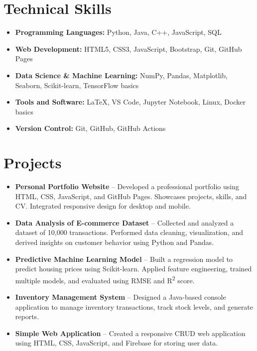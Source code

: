 \documentclass[a4paper,10pt]{article}
\begin{document}
\section*{Technical Skills}
\begin{itemize}[leftmargin=0.5cm]
    \item \textbf{Programming Languages:} Python, Java, C++, JavaScript, SQL
    \item \textbf{Web Development:} HTML5, CSS3, JavaScript, Bootstrap, Git, GitHub Pages
    \item \textbf{Data Science \& Machine Learning:} NumPy, Pandas, Matplotlib, Seaborn, Scikit-learn, TensorFlow basics
    \item \textbf{Tools and Software:} LaTeX, VS Code, Jupyter Notebook, Linux, Docker basics
    \item \textbf{Version Control:} Git, GitHub, GitHub Actions
\end{itemize}

\section*{Projects}
\begin{itemize}[leftmargin=0.5cm]
    \item \textbf{Personal Portfolio Website} -- Developed a professional portfolio using HTML, CSS, JavaScript, and GitHub Pages. Showcases projects, skills, and CV. Integrated responsive design for desktop and mobile.
    \item \textbf{Data Analysis of E-commerce Dataset} -- Collected and analyzed a dataset of 10,000 transactions. Performed data cleaning, visualization, and derived insights on customer behavior using Python and Pandas.
    \item \textbf{Predictive Machine Learning Model} -- Built a regression model to predict housing prices using Scikit-learn. Applied feature engineering, trained multiple models, and evaluated using RMSE and R\textsuperscript{2} score.
    \item \textbf{Inventory Management System} -- Designed a Java-based console application to manage inventory transactions, track stock levels, and generate reports.
    \item \textbf{Simple Web Application} -- Created a responsive CRUD web application using HTML, CSS, JavaScript, and Firebase for storing user data.
\end{itemize}
\end{document}
